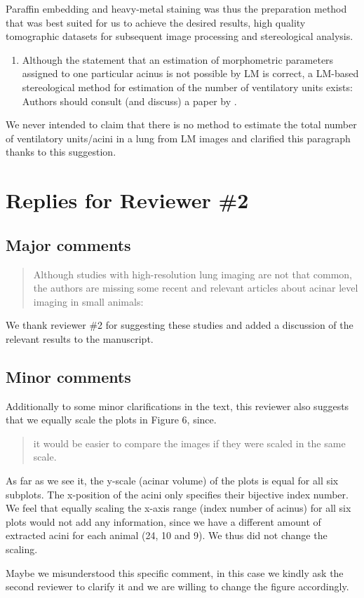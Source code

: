 \documentclass[english,paper=a4,DIV=calc]{scrartcl}
\begin{document}
Paraffin embedding and heavy-metal staining was thus the preparation method that was best suited for us to achieve the desired results, high quality tomographic datasets for subsequent image processing and stereological analysis.

\begin{enumerate}[start=5]
	\item \textelp{} Although the statement that an estimation of morphometric parameters assigned to one particular acinus is not possible by LM is correct, a LM-based stereological method for estimation of the number of ventilatory units \textelp{} exists: Authors should consult (and discuss) a paper by \citet{Wulfsohn2010}.
\end{enumerate}
We never intended to claim that there is no method to estimate the total number of ventilatory units/acini in a lung from LM images and clarified this paragraph thanks to this suggestion.

\section{Replies for Reviewer \#2}
\subsection{Major comments}
\blockquote{Although studies with high-resolution lung imaging are not that common, the authors are missing some recent and relevant articles about acinar level imaging in small animals:  \textelp{}}

We thank reviewer \#2 for suggesting these studies and added a discussion of the relevant results to the manuscript.

\subsection{Minor comments}
Additionally to some minor clarifications in the text, this reviewer also suggests that we equally scale the plots in Figure 6, since. 

\blockquote{it would be easier to compare the images if they were scaled in the same scale.}

As far as we see it, the y-scale (acinar volume) of the plots is equal for all six subplots.
The x-position of the acini only specifies their bijective index number.
We feel that equally scaling the x-axis range (index number of acinus) for all six plots would not add any information, since we have a different amount of extracted acini for each animal (24, 10 and 9).
We thus did not change the scaling.

Maybe we misunderstood this specific comment, in this case we kindly ask the second reviewer to clarify it and we are willing to change the figure accordingly.



%
\end{document}
